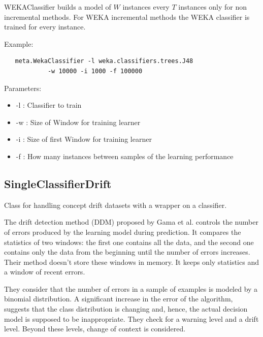 \documentclass[a4paper,12pt,twoside]{book}
\begin{document}
WEKAClassifier builds a model of $W$ instances every $T$ instances only for non incremental methods.
For WEKA incremental methods the WEKA classifier is trained for every instance.

 Example:
\begin{footnotesize}
\begin{verbatim}               
   meta.WekaClassifier -l weka.classifiers.trees.J48  
            -w 10000 -i 1000 -f 100000
\end{verbatim} \end{footnotesize}

Parameters:

\begin{itemize}
\item -l : Classifier to train
\item -w : Size of Window for training learner
\item -i : Size of first Window for training learner
\item -f : How many instances between samples of the learning performance
\end{itemize}

 \subsection{SingleClassifierDrift} Class for handling concept drift datasets with a wrapper on a
 classifier.

The drift detection method (DDM) proposed by Gama et al. controls 
the number of errors produced by the learning model during prediction. 
It compares the statistics of two windows: the first one contains all the data, 
and the second one contains only the data from the beginning until the number of
errors increases. Their method doesn't store these windows in memory. It keeps 
only statistics and a window of recent errors.

They consider that the number of errors in a sample of examples is modeled by a binomial 
distribution. A significant increase in the error of the algorithm, suggests
that the class distribution is changing and, hence, the actual decision model is
supposed to be inappropriate. They check for a warning level and a drift level. Beyond
these levels, change of context is considered.
\end{document}

